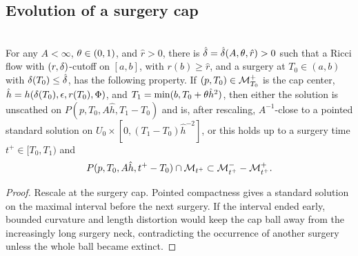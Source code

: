 \subsection{Evolution of a surgery cap}
\label{secII.4.5}

\begin{lemma}
  \label{lem:kl-evolution-surgery-cap-existence-standard-solutions}
\label{II.4.5}\\
For any $A<\infty$, $\theta\in(0,1)$, and $\hat r>0$, there is
$\hat{\delta}=\hat{\delta}(A,\theta,\hat r)>0$ such that a Ricci flow with
$(r,\delta)$-cutoff on $[a,b]$, with $r(b)\geq\hat r$, and a surgery at
$T_0\in(a,b)$ with $\delta(T_0)\leq\hat{\delta}$, has the following property.
If $(p,T_0)\in{\mathcal M}_{T_0}^+$ is the cap center,
$\hat h=h(\delta(T_0),\epsilon,r(T_0),\Phi)$, and
$T_1=\min(b,T_0+\theta\hat h^2)$, then either the solution is unscathed on
$P(p,T_0,A\hat h,T_1-T_0)$ and is, after rescaling, $A^{-1}$-close to a
pointed standard solution on
$U_0\times[0,(T_1-T_0)\hat h^{-2}]$, or this holds up to a surgery time
$t^+\in[T_0,T_1)$ and
\[
P(p,T_0,A\hat h,t^+-T_0)\cap{\mathcal M}_{t^+}
\subset{\mathcal M}_{t^+}^--{\mathcal M}_{t^+}^+.
\]
\end{lemma}
\begin{proof}
\sketch Rescale at the surgery cap. Pointed compactness gives a standard
solution on the maximal interval before the next surgery. If the interval
ended early, bounded curvature and length distortion would keep the cap ball
away from the increasingly long surgery neck, contradicting the occurrence
of another surgery unless the whole ball became extinct.
\end{proof}

